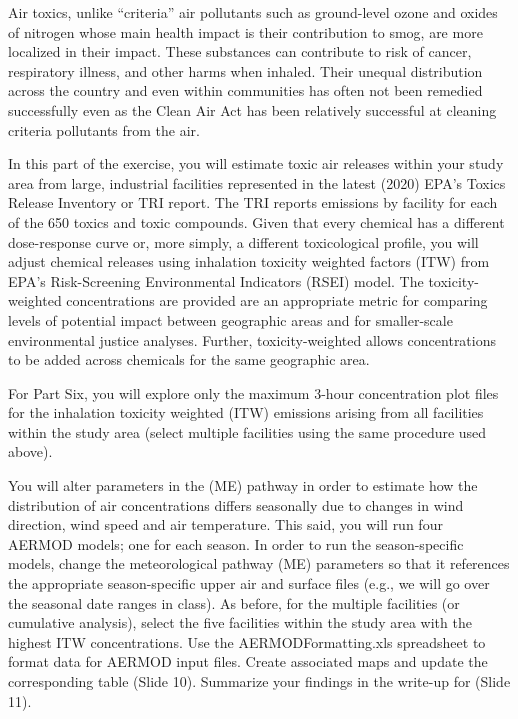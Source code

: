 \documentclass[
  letterpaper,
  DIV=11,
  numbers=noendperiod]{scrartcl}
\begin{document}
Air toxics, unlike ``criteria'' air pollutants such as ground-level
ozone and oxides of nitrogen whose main health impact is their
contribution to smog, are more localized in their impact. These
substances can contribute to risk of cancer, respiratory illness, and
other harms when inhaled. Their unequal distribution across the country
and even within communities has often not been remedied successfully
even as the Clean Air Act has been relatively successful at cleaning
criteria pollutants from the air.

In this part of the exercise, you will estimate toxic air releases
within your study area from large, industrial facilities represented in
the latest (2020) EPA's Toxics Release Inventory or TRI report. The TRI
reports emissions by facility for each of the 650 toxics and toxic
compounds. Given that every chemical has a different dose-response curve
or, more simply, a different toxicological profile, you will adjust
chemical releases using inhalation toxicity weighted factors (ITW) from
EPA's Risk-Screening Environmental Indicators (RSEI) model. The
toxicity-weighted concentrations are provided are an appropriate metric
for comparing levels of potential impact between geographic areas and
for smaller-scale environmental justice analyses. Further,
toxicity-weighted allows concentrations to be added across chemicals for
the same geographic area.

For Part Six, you will explore only the maximum 3-hour concentration
plot files for the inhalation toxicity weighted (ITW) emissions arising
from all facilities within the study area (select multiple facilities
using the same procedure used above).

You will alter parameters in the (ME) pathway in order to estimate how
the distribution of air concentrations differs seasonally due to changes
in wind direction, wind speed and air temperature. This said, you will
run four AERMOD models; one for each season. In order to run the
season-specific models, change the meteorological pathway (ME)
parameters so that it references the appropriate season-specific upper
air and surface files (e.g., we will go over the seasonal date ranges in
class). As before, for the multiple facilities (or cumulative analysis),
select the five facilities within the study area with the highest ITW
concentrations. Use the AERMODFormatting.xls spreadsheet to format data
for AERMOD input files. Create associated maps and update the
corresponding table (Slide 10). Summarize your findings in the write-up
for (Slide 11).
\end{document}

